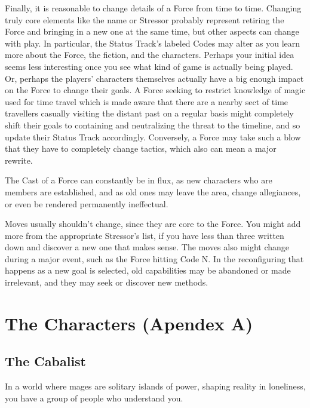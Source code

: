 \documentclass[
  oneside,
  statementpaper,
  9pt]{memoir}
\begin{document}
\begin{MC}
Finally, it is reasonable to change details of a Force from time to time. Changing truly core elements like the name or Stressor probably represent retiring the Force and bringing in a new one at the same time, but other aspects can change with play. In particular, the Status Track’s labeled Codes may alter as you learn more about the Force, the fiction, and the characters. Perhaps your initial idea seems less interesting once you see what kind of game is actually being played. Or, perhaps the players’ characters themselves actually have a big enough impact on the Force to change their goals. A Force seeking to restrict knowledge of magic used for time travel which is made aware that there are a nearby sect of time travellers casually visiting the distant past on a regular basis might completely shift their goals to containing and neutralizing the threat to the timeline, and so update their Status Track accordingly. Conversely, a Force may take such a blow that they have to completely change tactics, which also can mean a major rewrite.

The Cast of a Force can constantly be in flux, as new characters who are members are established, and as old ones may leave the area, change allegiances, or even be rendered permanently ineffectual.

Moves usually shouldn’t change, since they are core to the Force. You might add more from the appropriate Stressor’s list, if you have less than three written down and discover a new one that makes sense. The moves also might change during a major event, such as the Force hitting Code N. In the reconfiguring that happens as a new goal is selected, old capabilities may be abandoned or made irrelevant, and they may seek or discover new methods.

\end{MC}

\setlength{\parindent}{0em}

\hypertarget{the-characters-apendex-a}{%
\chapter{The Characters (Apendex A)}\label{the-characters-apendex-a}}

\hypertarget{the-cabalist}{%
\section{The Cabalist}\label{the-cabalist}}

In a world where mages are solitary islands of power, shaping reality in
loneliness, you have a group of people who understand you.
\end{document}
